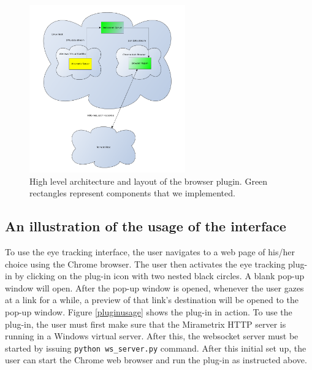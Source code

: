 \documentclass[english]{tktltiki}
\begin{document}
\begin{figure}[h]
\begin{center}
\includegraphics[width=0.6\textwidth]{plugin_architecture.png}
\caption{High level architecture and layout of the browser plugin. Green rectangles represent components that we implemented.}
\label{pluginarchitecture}
\end{center}
\end{figure}

\subsection{An illustration of the usage of the interface}

To use the eye tracking interface, the user navigates to a web page of his/her choice using the Chrome browser. The user then activates the eye tracking plug-in by clicking on the plug-in icon with two nested black circles. A blank pop-up window will open. After the pop-up window is opened, whenever the user gazes at a link for a while, a preview of that link's destination will be opened to the pop-up window. Figure \ref{pluginusage} shows the plug-in in action. To use the plug-in, the user must first make sure that the Mirametrix HTTP server is running in a Windows virtual server. After this, the websocket server must be started by issuing \verb|python ws_server.py| command. After this initial set up, the user can start the Chrome web browser and run the plug-in as instructed above.
\end{document}
